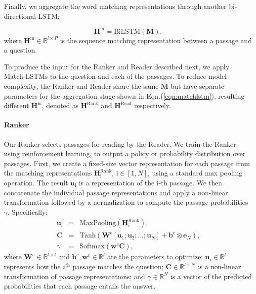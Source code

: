 \documentclass[letterpaper]{article} %
\begin{document}
Finally, we aggregate the word matching representations through another bi-directional LSTM:


\begin{equation}
\mathbf{H}^{\text{m}} = \text{BiLSTM} (\mathbf{M}),
\label{eqn:matchlstm}
\end{equation}
where $\mathbf{H}^{\text{m}} \in \mathbb{R}^{l\times P}$ is the sequence matching representation between a passage and a question.

To produce the input for the Ranker and Reader described next, we apply Match-LSTMs to the question and each of the passages.  To reduce model complexity, the Ranker and Reader share the same $\mathbf{M}$ but have separate parameters for the aggregation stage shown in Eqn.(\ref{eqn:matchlstm}), resulting different $\mathbf{H}^{\text{m}}$, denoted as $\mathbf{H}^{\text{Rank}}$ and $\mathbf{H}^{\text{Read}}$ respectively.


\paragraph{Ranker}
Our Ranker selects passages for reading by the Reader.
We train the Ranker using reinforcement learning, to output a policy or probability distribution over passages. 
First, we create a fixed-size vector  representation for each passage from the matching representations  $\mathbf{H}^{\text{Rank}}_{\text{i}}$, $\text{i} \in [1,N]$, using a standard max pooling operation.  The result $\textbf{u}_{\text{i}}$ is a representation of the $\text{i}$-th passage. We then concatenate the individual passage representations and apply a non-linear transformation followed by a normalization to compute the passage probabilities $\gamma$.  Specifically:
\begin{eqnarray}
\nonumber
\textbf{u}_i &=& \text{MaxPooling}(\mathbf{H}^{\text{Rank}}_\text{i}), \\
\nonumber
\mathbf{C} &=& \text{Tanh}\left( \mathbf{W}^\text{c}[\textbf{u}_1;\textbf{u}_2;...;\textbf{u}_N] + \mathbf{b}^\text{c} \otimes \mathbf{e}_{N} \right ), \\
\gamma &=& \text{Softmax}(\mathbf{w}^c \mathbf{C}),
\label{eqn:gamma}
\end{eqnarray}
where $\mathbf{W}^\text{c}\in \mathbb{R}^{l\times l}$ and $\mathbf{b}^\text{c},\mathbf{w}^\text{c}\in \mathbb{R}^{l}$ are the parameters to optimize; $\textbf{u}_i \in \mathbb{R}^{l}$ represents how the $i^{\text{th}}$ passage matches the question; $\mathbf{C}\in \mathbb{R}^{l\times N}$ is a non-linear transformation of passage representations; and $\gamma\in \mathbb{R}^N$ is a vector of the predicted probabilities that each passage entails the answer.
\end{document}
